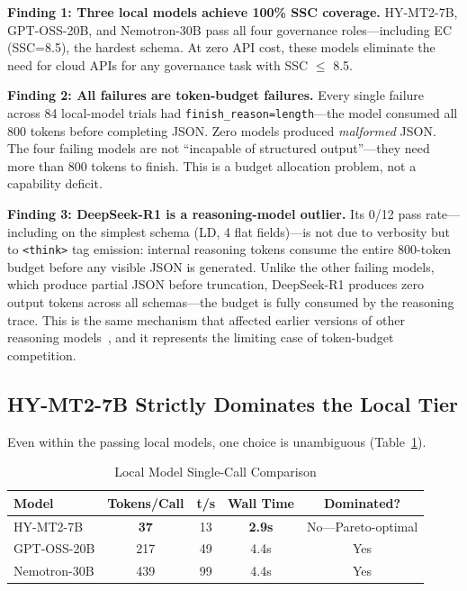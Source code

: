 \documentclass[11pt,a4paper]{article}
\begin{document}
\textbf{Finding 1: Three local models achieve 100\% SSC coverage.} HY-MT2-7B, GPT-OSS-20B, and Nemotron-30B pass all four governance roles---including EC (SSC=8.5), the hardest schema. At zero API cost, these models eliminate the need for cloud APIs for any governance task with SSC $\leq$ 8.5.

\textbf{Finding 2: All failures are token-budget failures.} Every single failure across 84 local-model trials had \texttt{finish\_reason=length}---the model consumed all 800 tokens before completing JSON. Zero models produced \textit{malformed} JSON. The four failing models are not ``incapable of structured output''---they need more than 800 tokens to finish. This is a budget allocation problem, not a capability deficit.

\textbf{Finding 3: DeepSeek-R1 is a reasoning-model outlier.} Its 0/12 pass rate---including on the simplest schema (LD, 4 flat fields)---is not due to verbosity but to \texttt{<think>} tag emission: internal reasoning tokens consume the entire 800-token budget before any visible JSON is generated. Unlike the other failing models, which produce partial JSON before truncation, DeepSeek-R1 produces zero output tokens across all schemas---the budget is fully consumed by the reasoning trace. This is the same mechanism that affected earlier versions of other reasoning models~\cite{chen2026empirical}, and it represents the limiting case of token-budget competition.

\subsection{HY-MT2-7B Strictly Dominates the Local Tier}

Even within the passing local models, one choice is unambiguous (Table~\ref{tab:local_dominance}).

\begin{table}[htbp]\centering\caption{Local Model Single-Call Comparison}\label{tab:local_dominance}\small
\begin{tabular}{lcccc}\toprule\textbf{Model} & \textbf{Tokens/Call} & \textbf{t/s} & \textbf{Wall Time} & \textbf{Dominated?}\\\midrule
HY-MT2-7B & \textbf{37} & 13 & \textbf{2.9s} & No---Pareto-optimal\\
GPT-OSS-20B & 217 & 49 & 4.4s & Yes\\
Nemotron-30B & 439 & 99 & 4.4s & Yes\\\bottomrule
\end{tabular}
\end{table}
\end{document}
